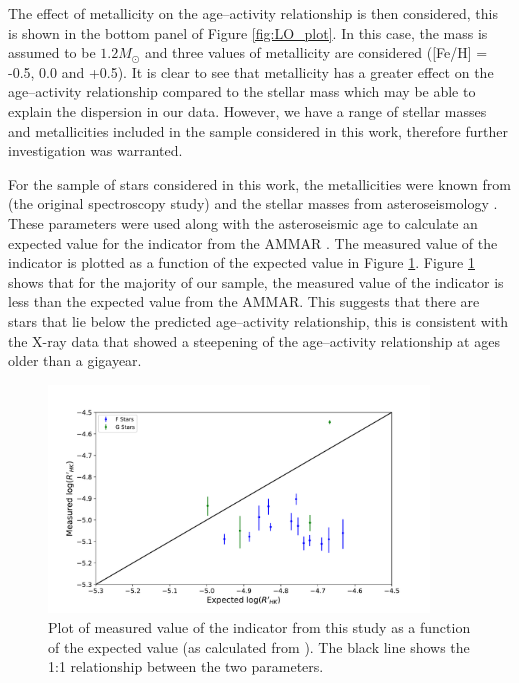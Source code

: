 The effect of metallicity on the age--activity relationship is then considered, this is shown in the bottom panel of Figure \ref{fig:LO_plot}. In this case, the mass is assumed to be $1.2 M_{\odot}$ and three values of metallicity are considered ([Fe/H] = -0.5, 0.0 and +0.5). It is clear to see that metallicity has a greater effect on the age--activity relationship compared to the stellar mass which may be able to explain the dispersion in our data. However, we have a range of stellar masses and metallicities included in the sample considered in this work, therefore further investigation was warranted.

For the sample of stars considered in this work, the metallicities were known from \citet{Bruntt_etal_2012} (the original spectroscopy study) and the stellar masses from asteroseismology \citep{Chaplin_etal_2014,Silva_Aguirre_etal_2017}. These parameters were used along with the asteroseismic age to calculate an expected value for the \Rprime indicator from the AMMAR \citep{Lorenzo_Oliveira_etal_2016}. The measured value of the \Rprime indicator is plotted as a function of the expected value in Figure \ref{fig:Rprime_measured_v_expected}. Figure \ref{fig:Rprime_measured_v_expected} shows that for the majority of our sample, the measured value of the \Rprime indicator is less than the expected value from the AMMAR. This suggests that there are stars that lie below the predicted age--activity relationship, this is consistent with the X-ray data \citep{Booth_etal_2017} that showed a steepening of the age--activity relationship at ages older than a gigayear.

\begin{figure}
    \centering
    \includegraphics[width=0.9\textwidth]{Figures/4-Chromospheric_age/rhk_measured_v_expected.pdf}
    \caption[Measured \Rprime as a function of the expected value including mass and metallicity]{Plot of measured value of the \Rprime indicator from this study as a function of the expected value (as calculated from \citealt{Lorenzo_Oliveira_etal_2016}). The black line shows the 1:1 relationship between the two parameters.}
    \label{fig:Rprime_measured_v_expected}
\end{figure}

